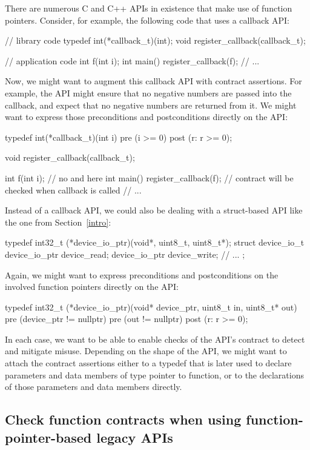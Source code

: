 There are numerous C and C++ APIs in existence that make use of function pointers. Consider, for example, the following code that uses a callback API:
\begin{codeblock}
// library code
typedef int(*callback_t)(int);
void register_callback(callback_t);

// application code
int f(int i); 
int main() {
  register_callback(f);
  // ...
}
\end{codeblock}
Now, we might want to augment this callback API with contract assertions. For example, the  API might ensure that no negative numbers are passed into the callback, and expect that no negative numbers are returned from it. We might want to express those preconditions and postconditions directly on the API:
\begin{codeblock}
typedef int(*callback_t)(int i) 
  pre (i >= 0) 
  post (r: r >= 0);
  
void register_callback(callback_t);
  
int f(int i);  // no  and  here
int main() {
  register_callback(f);  // contract will be checked when callback is called
  // ...
}
\end{codeblock}
Instead of a callback API, we could also be dealing with a struct-based API like the one from Section~\ref{intro}:
\begin{codeblock}
typedef int32_t (*device_io_ptr)(void*, uint8_t, uint8_t*);
struct device_io_t {
  device_io_ptr device_read;
  device_io_ptr device_write;
  // ...
};
\end{codeblock}
Again, we might want to express preconditions and postconditions on the involved function pointers directly on the API:
\begin{codeblock}
typedef int32_t (*device_io_ptr)(void* device_ptr, uint8_t in, uint8_t* out)
  pre (device_ptr != nullptr)
  pre (out != nullptr)
  post (r: r >= 0);
  
\end{codeblock}
In each case, we want to be able to enable checks of the API's contract to detect and mitigate misuse. Depending on the shape of the API, we might want to attach the contract assertions either to a typedef that is later used to declare parameters and data members of type pointer to function, or to the declarations of those parameters and data members directly.
\subsection{Check function contracts when using function-pointer-based legacy APIs}
\label{usecase_legacyapi}


